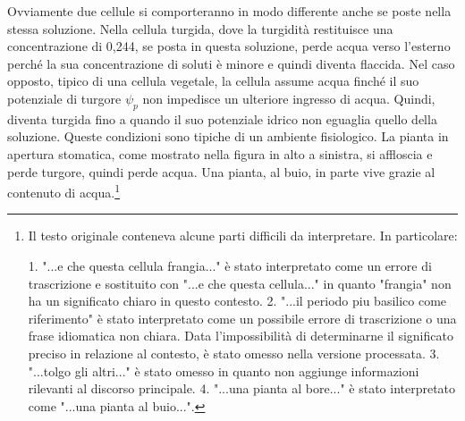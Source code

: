 \documentclass[11pt, a4paper]{article}
\begin{document}
\begin{spacing}{1.15}
Ovviamente due cellule si comporteranno in modo differente anche se poste nella stessa soluzione. Nella cellula turgida, dove la turgidità restituisce una concentrazione di 0,244, se posta in questa soluzione, perde acqua verso l'esterno perché la sua concentrazione di soluti è minore e quindi diventa flaccida. Nel caso opposto, tipico di una cellula vegetale, la cellula assume acqua finché il suo potenziale di turgore $\psi_p$ non impedisce un ulteriore ingresso di acqua. Quindi, diventa turgida fino a quando il suo potenziale idrico non eguaglia quello della soluzione. Queste condizioni sono tipiche di un ambiente fisiologico. La pianta in apertura stomatica, come mostrato nella figura in alto a sinistra, si affloscia e perde turgore, quindi perde acqua. Una pianta, al buio, in parte vive grazie al contenuto di acqua.\footnote{Il testo originale conteneva alcune parti difficili da interpretare. In particolare:

1. "...e che questa cellula frangia..." è stato interpretato come un errore di trascrizione e sostituito con "...e che questa cellula..." in quanto "frangia" non ha un significato chiaro in questo contesto.
2. "...il periodo piu basilico come riferimento" è stato interpretato come un possibile errore di trascrizione o una frase idiomatica non chiara. Data l'impossibilità di determinarne il significato preciso in relazione al contesto, è stato omesso nella versione processata.
3. "...tolgo gli altri..." è stato omesso in quanto non aggiunge informazioni rilevanti al discorso principale.
4. "...una pianta al bore..." è stato interpretato come "...una pianta al buio...".

}
\end{spacing}
\end{document}
